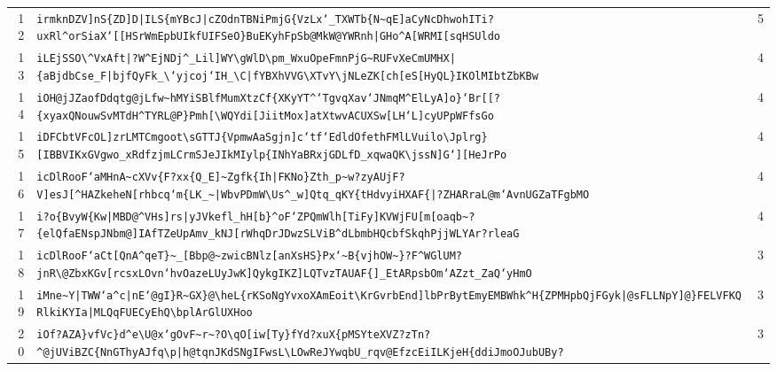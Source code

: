 \begin{xltabular}{\textwidth}{@{} r >{\raggedright\arraybackslash}X r @{}}
        12 & \texttt{irmknDZV]nS\{ZD]D|ILS\{mYBcJ|cZOdnTBNiPmjG\{VzLx`\_TXWTb\{N\textasciitilde{}qE]aCyNcDhwohITi?uxRl\textasciicircum{}orSiaX`[[HSrWmEpbUIkfUIFSeO\}BuEKyhFpSb@MkW@YWRnh|GHo\textasciicircum{}A[WRMI[sqHSUldo} & 5 \\
        13 & \texttt{iLEjSSO\textbackslash{}\textasciicircum{}VxAft|?W\textasciicircum{}EjNDj\textasciicircum{}\_Lil]WY\textbackslash{}gWlD\textbackslash{}pm\_WxuOpeFmnPjG\textasciitilde{}RUFvXeCmUMHX|\{aBjdbCse\_F|bjfQyFk\_\textbackslash{}`yjcoj`IH\_\textbackslash{}C|fYBXhVVG\textbackslash{}XTvY\textbackslash{}jNLeZK[ch[eS[HyQL\}IKOlMIbtZbKBw} & 4 \\
        14 & \texttt{iOH@jJZaofDdqtg@jLfw\textasciitilde{}hMYiSBlfMumXtzCf\{XKyYT\textasciicircum{}`TgvqXav`JNmqM\textasciicircum{}ElLyA]o\}`Br[[?\{xyaxQNouwSvMTdH\textasciicircum{}TYRL@P\}Pmh[\textbackslash{}WQYdi[JiitMox]atXtwvACUXSw[LH`L]cyUPpWFfsGo} & 4 \\
        15 & \texttt{iDFCbtVFcOL]zrLMTCmgoot\textbackslash{}sGTTJ\{VpmwAaSgjn]c`tf`EdldOfethFMlLVuilo\textbackslash{}Jplrg\}[IBBVIKxGVgwo\_xRdfzjmLCrmSJeJIkMIylp\{INhYaBRxjGDLfD\_xqwaQK\textbackslash{}jssN]G`][HeJrPo} & 4 \\
        16 & \texttt{icDlRooF`aMHnA\textasciitilde{}cXVv\{F?xx\{Q\_E]\textasciitilde{}Zgfk\{Ih|FKNo\}Zth\_p\textasciitilde{}w?zyAUjF?V]esJ[\textasciicircum{}HAZkeheN[rhbcq`m\{LK\_\textasciitilde{}|WbvPDmW\textbackslash{}Us\textasciicircum{}\_w]Qtq\_qKY\{tHdvyiHXAF\{|?ZHARraL@m`AvnUGZaTFgbMO} & 4 \\
        17 & \texttt{i?o\{BvyW\{Kw|MBD@\textasciicircum{}VHs]rs|yJVkefl\_hH[b\}\textasciicircum{}oF`ZPQmWlh[TiFy]KVWjFU[m[oaqb\textasciitilde{}?\{elQfaENspJNbm@]IAfTZeUpAmv\_kNJ[rWhqDrJDwzSLViB\textasciicircum{}dLbmbHQcbfSkqhPjjWLYAr?rleaG} & 4 \\
        18 & \texttt{icDlRooF`aCt[QnA\textasciicircum{}qeT\}\textasciitilde{}\_[Bbp@\textasciitilde{}zwicBNlz[anXsHS\}Px`\textasciitilde{}B\{vjhOW\textasciitilde{}\}?F\textasciicircum{}WGlUM?jnR\textbackslash{}@ZbxKGv[rcsxLOvn`hvOazeLUyJwK]QykgIKZ]LQTvzTAUAF\{]\_EtARpsbOm`AZzt\_ZaQ`yHmO} & 3 \\
        19 & \texttt{iMne\textasciitilde{}Y|TWW`a\textasciicircum{}c|nE`@gI\}R\textasciitilde{}GX\}@\textbackslash{}heL\{rKSoNgYvxoXAmEoit\textbackslash{}KrGvrbEnd]lbPrBytEmyEMBWhk\textasciicircum{}H\{ZPMHpbQjFGyk|@sFLLNpY]@\}FELVFKQRlkiKYIa|MLQqFUECyEhQ\textbackslash{}bplArGlUXHoo} & 3 \\
        20 & \texttt{iOf?AZA\}vfVc\}d\textasciicircum{}e\textbackslash{}U@x`gOvF\textasciitilde{}r\textasciitilde{}?O\textbackslash{}qO[iw[Ty\}fYd?xuX\{pMSYteXVZ?zTn?\textasciicircum{}@jUViBZC\{NnGThyAJfq\textbackslash{}p|h@tqnJKdSNgIFwsL\textbackslash{}LOwReJYwqbU\_rqv@EfzcEiILKjeH\{ddiJmoOJubUBy?} & 3 \\

\end{xltabular}
